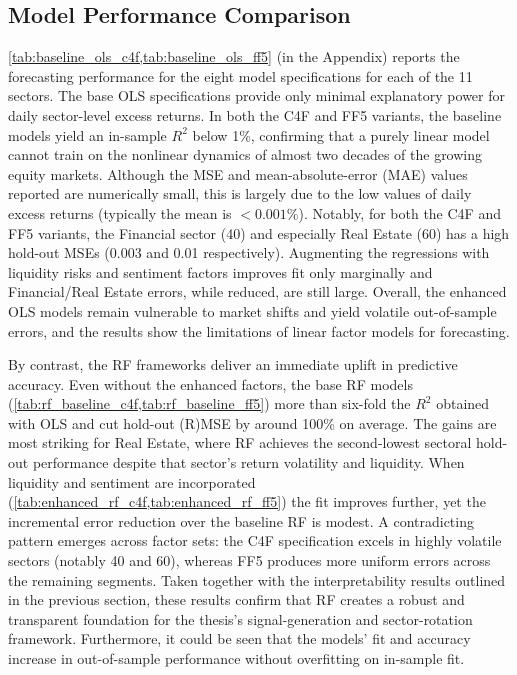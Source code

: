 \subsection{Model Performance Comparison}
\cref{tab:baseline_ols_c4f,tab:baseline_ols_ff5} (in the Appendix) reports the forecasting performance for the eight model specifications for each of the 11 sectors.  The base OLS specifications provide only minimal explanatory power for daily sector-level excess returns.  In both the C4F and FF5 variants, the baseline models yield an in-sample $R^{2}$ below 1\%, confirming that a purely linear model cannot train on the nonlinear dynamics of almost two decades of the growing equity markets.  Although the MSE and mean-absolute-error (MAE) values reported are numerically small, this is largely due to the low values of daily excess returns (typically the mean is $<0.001\%$).  Notably, for both the C4F and FF5 variants, the Financial sector (40) and especially Real Estate (60) has a high hold-out MSEs (0.003 and 0.01 respectively).  Augmenting the regressions with liquidity risks and sentiment factors improves fit only marginally and Financial/Real Estate errors, while reduced, are still large. Overall, the enhanced OLS models remain vulnerable to market shifts and yield volatile out-of-sample errors, and the results show the limitations of linear factor models for forecasting.

By contrast, the RF frameworks deliver an immediate uplift in predictive accuracy.  Even without the enhanced factors, the base RF models (\cref{tab:rf_baseline_c4f,tab:rf_baseline_ff5}) more than six-fold the $R^{2}$ obtained with OLS and cut hold-out (R)MSE by around 100\% on average.  The gains are most striking for Real Estate, where RF achieves the second-lowest sectoral hold-out performance despite that sector's return volatility and liquidity.  When liquidity and sentiment are incorporated (\cref{tab:enhanced_rf_c4f,tab:enhanced_rf_ff5}) the fit improves further, yet the incremental error reduction over the baseline RF is modest. A contradicting pattern emerges across factor sets: the C4F specification excels in highly volatile sectors (notably 40 and 60), whereas FF5 produces more uniform errors across the remaining segments.  Taken together with the interpretability results outlined in the previous section, these results confirm that RF creates a robust and transparent foundation for the thesis's signal-generation and sector-rotation framework.  Furthermore, it could be seen that the models' fit and accuracy increase in out-of-sample performance without overfitting on in-sample fit.

